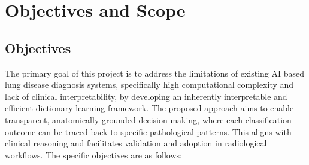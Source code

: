 \section{Objectives and Scope}
\subsection{Objectives}

The primary goal of this project is to address the limitations of existing AI based lung disease diagnosis systems, specifically
high computational complexity and lack of clinical interpretability, by developing an inherently interpretable and
efficient dictionary learning framework. The proposed approach aims to enable transparent, anatomically grounded decision making,
where each classification outcome can be traced back to specific pathological patterns. This aligns with clinical reasoning and
facilitates validation and adoption in radiological workflows. The specific objectives are as follows:

